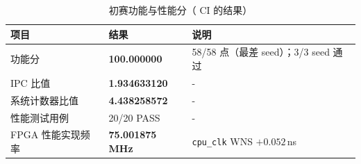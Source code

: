 \begin{table}[H]
\centering
\caption{初赛功能与性能分（ CI 的结果）}
\label{tab:perf}
\small
\begin{tabular}{lll}
\toprule
项目 & 结果 & 说明 \\
\midrule
功能分 & \textbf{100.000000} & 58/58 点（最差 seed）；3/3 seed 通过 \\
IPC 比值 & \textbf{1.934633120} & - \\
系统计数器比值 & \textbf{4.438258572} & - \\
性能测试用例 & 20/20 PASS & - \\
FPGA 性能实现频率 & \textbf{75.001875\,MHz} & \texttt{cpu\_clk} WNS $+0.052$\,ns \\
\bottomrule
\end{tabular}
\end{table}



